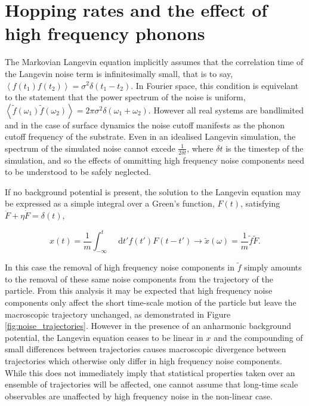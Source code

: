 \documentclass{article}
\newcommand*{\diff}{\mathop{}\!\mathrm{d}}
\begin{document}
\section{Hopping rates and the effect of high frequency phonons}

The Markovian Langevin equation implicitly assumes that the correlation time of the Langevin noise term is infinitesimally small, that is to say, $\left< f(t_1) f(t_2) \right> = \sigma^2 \delta (t_1 - t_2)$. In Fourier space, this condition is equivelant to the statement that the power spectrum of the noise is uniform, $\left< \tilde{f}(\omega_1) \tilde{f}(\omega_2) \right> = 2 \pi \sigma^2 \delta(\omega_1 + \omega_2)$. However all real systems are bandlimited and in the case of surface dynamics the noise cutoff manifests as the phonon cutoff frequency of the substrate. Even in an idealised Langevin simulation, the spectrum of the simulated noise cannot excede $\frac{1}{2\delta{t}}$, where $\delta{t}$ is the timestep of the simulation, and so the effects of ommitting high frequency noise components need to be understood to be safely neglected. 

If no background potential is present, the solution to the Langevin equation may be expressed as a simple integral over a Green's function, $F(t)$, satisfying $\ddot{F} + \eta \dot{F} = \delta(t)$,

$$
x(t) = \frac{1}{m} \int_{-\infty}^t \diff{t'} f(t') F(t-t') \longrightarrow \tilde{x}(\omega) = \frac{1}{m} \tilde{f} \tilde{F}.
$$ 

In this case the removal of high frequency noise components in $\tilde{f}$ simply amounts to the removal of these same noise components from the trajectory of the particle. From this analysis it may be expected that high frequency noise components only affect the short time-scale motion of the particle but leave the macroscopic trajectory unchanged, as demonstrated in Figure \ref{fig:noise_trajectories}. However in the presence of an anharmonic background potential, the Langevin equation ceases to be linear in $x$ and the compounding of small differences between trajectories causes macroscopic divergence between trajectories which otherwise only differ in high frequency noise components. While this does not immediately imply that statistical properties taken over an ensemble of trajectories will be affected, one cannot assume that long-time scale observables are unaffected by high frequency noise in the non-linear case.
\end{document}
